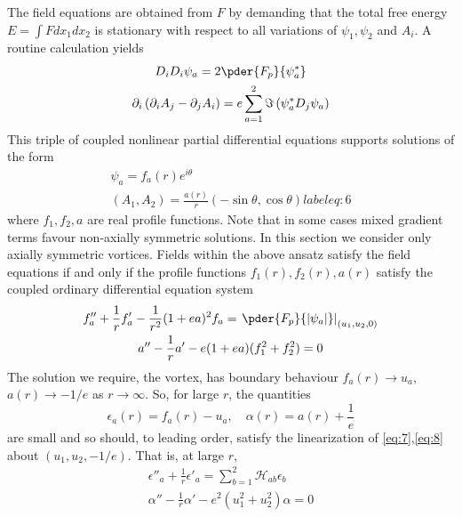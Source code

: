 The field equations are obtained from \( F \) by demanding that the total 
free energy \( E = \int F dx_1 dx_2 \) is stationary with respect to all 
variations of \( \psi_1, \psi_2 \) and \( A_i \). A routine calculation yields 
\begin{gather}
    D_i D_i \psi_a = 2\pder{F_p}{\psi_a^{*}}
    \label{eq:4} \\
    \partial_i \left( \partial_i A_j - \partial_j A_i \right) = 
        e\sum\limits_{a=1}^{2}\Im\left( \psi_a^* D_j \psi_a \right)
    \label{eq:5}
\end{gather}
This triple of coupled nonlinear partial differential equations supports 
solutions of the form
\begin{gather}
    \psi_a = f_a(r)e^{i\theta} \nonumber \\
    (A_1, A_2) = \frac{a(r)}{r}(-\sin\theta, \cos\theta)
    label{eq:6}
\end{gather}
where \( f_1, f_2, a \) are real profile functions. Note that in some cases 
mixed gradient terms favour non-axially symmetric solutions. In this section 
we consider only axially symmetric vortices. Fields within the above ansatz 
satisfy the field equations if and only if the profile functions 
\( f_1(r), f_2(r), a(r) \) satisfy the coupled ordinary differential equation 
system
\begin{gather}
    f''_a + \frac{1}{r} f'_a - \frac{1}{r^2}(1+ea)^2 f_a = 
        \left. \pder{F_p}{|\psi_a|} \right|_{(u_1, u_2, 0)}
    \label{eq:7} \\
    a'' - \frac{1}{r} a' - e(1+ea)(f_1^2+f_2^2) = 0
    \label{eq:8}
\end{gather}
The solution we require, the vortex, has boundary behaviour 
\( f_a(r) \rightarrow u_a \), \( a(r) \rightarrow -1/e \) as 
\( r \rightarrow \infty \). So, for large \( r \), the quantities 
\begin{equation}
    \epsilon_a(r) = f_a(r) - u_a, \quad
    \alpha(r) = a(r) + \frac{1}{e}
    \label{eq:9}
\end{equation}
are small and so should, to leading order, satisfy the linearization of 
\eqref{eq:7},\eqref{eq:8} about \( (u_1, u_2, -1/e) \). That is, at large 
\( r \),
\begin{gather}
    \epsilon''_a + \frac{1}{r} \epsilon'_a = \sum\limits_{b=1}^{2}
        \mathcal{H}_{ab} \epsilon_b
    \label{eq:10} \\
    \alpha'' - \frac{1}{r} \alpha' - e^2(u_1^2 + u_2^2 )\alpha = 0
    \label{eq:11}
\end{gather}
